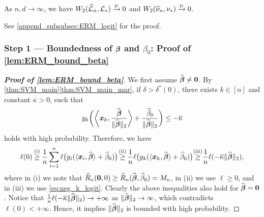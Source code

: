 \begin{lem}
\label{lem:ERM_logit_conv}
    As $n, d \to \infty$, we have $W_2( \widehat {\mathcal{L}}_{n}, \mathcal{L}_* ) \xrightarrow{\mathrm{p}} 0$ and $W_2 ( \widehat \nu_{n}, \nu_* ) \xrightarrow{\mathrm{p}} 0$.
\end{lem}
\noindent
See \cref{append_subsubsec:ERM_logit} for the proof.


\subsubsection{Step 1 --- Boundedness of ${\boldsymbol{\beta}}$ and $\beta_0$: Proof of \cref{lem:ERM_bound_beta}}
\label{subsubsec:under_step1}

\begin{proof}[\textbf{Proof of \cref{lem:ERM_bound_beta}}]
    We first assume $\widehat{{\boldsymbol{\beta}}} \not= \mathrm{\bf 0}$. By \cref{thm:SVM_main}\ref{thm:SVM_main_mar}, if $\delta > \delta^*(0)$, there exists $k \in [n]$ and constant $\overline{\kappa} > 0$, such that
    \begin{equation}
        \label{eq:neg_k_logit}
        y_k \biggl(  \biggl\langle \text{\boldmath $x$}_k, \frac{\widehat{\text{\boldmath $\beta$}}}{\|\widehat{\text{\boldmath $\beta$}}\|_2} \biggr\rangle + \frac{\widehat\beta_0}{\|\widehat{\text{\boldmath $\beta$}}\|_2} \biggr) \le - \overline{\kappa}
    \end{equation}
    holds with high probability. Therefore, we have
    \begin{equation*}
            \ell(0) 
               \overset{\mathmakebox[0pt][c]{\smash{\text{(i)}}}}{\ge}
                \frac1n \sum_{i=1}^n \ell\bigl( 
                y_i(\< \xx_i, \hat\bbeta \> +  \hat\beta_0 ) \bigr)
               \overset{\mathmakebox[0pt][c]{\smash{\text{(ii)}}}}{\ge}
                \frac1n \ell\bigl( 
                y_k(\< \xx_k, \hat\bbeta \> +  \hat\beta_0 ) \bigr)
               \overset{\mathmakebox[0pt][c]{\smash{\text{(iii)}}}}{\ge}
                \frac1n \ell( - \overline{\kappa} \|\hat\bbeta\|_2 ),
    \end{equation*}
    where in (i) we note that $\widehat R_n(\mathrm{\bf 0}, 0) \ge \widehat R_n(\widehat{\text{\boldmath $\beta$}}, \widehat\beta_0) = M_n$, in (ii) we use $\ell \ge 0$, and in (iii) we use \eqref{eq:neg_k_logit}. Clearly the above inequalities also hold for $\widehat{{\boldsymbol{\beta}}} = \mathrm{\bf 0}$. Notice that $\frac1n \ell( - \overline{\kappa} \|\widehat{\text{\boldmath $\beta$}}\|_2 ) \to +\infty$ as $\|\widehat{\text{\boldmath $\beta$}}\|_2 \to \infty$, which contradicts $\ell(0) < +\infty$. Hence, it implies $\|\widehat{\text{\boldmath $\beta$}}\|_2$ is bounded with high probability.


\end{proof}
